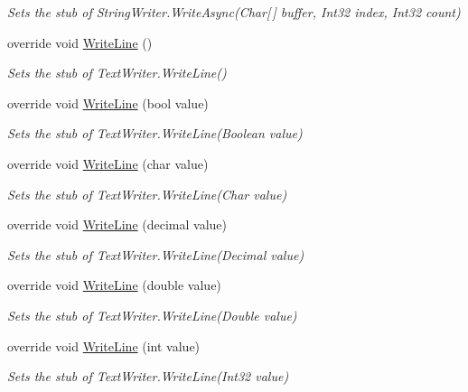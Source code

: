 \begin{DoxyCompactItemize}
\begin{DoxyCompactList}\small\item\em Sets the stub of String\-Writer.\-Write\-Async(\-Char\mbox{[}$\,$\mbox{]} buffer, Int32 index, Int32 count)\end{DoxyCompactList}\item 
override void \hyperlink{class_system_1_1_i_o_1_1_fakes_1_1_stub_string_writer_a6a7a9ef8c75e1f8643107f5061cd4735}{Write\-Line} ()
\begin{DoxyCompactList}\small\item\em Sets the stub of Text\-Writer.\-Write\-Line()\end{DoxyCompactList}\item 
override void \hyperlink{class_system_1_1_i_o_1_1_fakes_1_1_stub_string_writer_a6d8778a6d609ba95a9e8a820251996f5}{Write\-Line} (bool value)
\begin{DoxyCompactList}\small\item\em Sets the stub of Text\-Writer.\-Write\-Line(\-Boolean value)\end{DoxyCompactList}\item 
override void \hyperlink{class_system_1_1_i_o_1_1_fakes_1_1_stub_string_writer_a2ec24c67b82b96d9ad8223518e0c7ded}{Write\-Line} (char value)
\begin{DoxyCompactList}\small\item\em Sets the stub of Text\-Writer.\-Write\-Line(\-Char value)\end{DoxyCompactList}\item 
override void \hyperlink{class_system_1_1_i_o_1_1_fakes_1_1_stub_string_writer_aa4e3aba6ba44803cfe6b12130e55f5dc}{Write\-Line} (decimal value)
\begin{DoxyCompactList}\small\item\em Sets the stub of Text\-Writer.\-Write\-Line(\-Decimal value)\end{DoxyCompactList}\item 
override void \hyperlink{class_system_1_1_i_o_1_1_fakes_1_1_stub_string_writer_a4019fefae40c8c9288733bfb4a9256ec}{Write\-Line} (double value)
\begin{DoxyCompactList}\small\item\em Sets the stub of Text\-Writer.\-Write\-Line(\-Double value)\end{DoxyCompactList}\item 
override void \hyperlink{class_system_1_1_i_o_1_1_fakes_1_1_stub_string_writer_a99124e019b98f38a631ac138c29b43d7}{Write\-Line} (int value)
\begin{DoxyCompactList}\small\item\em Sets the stub of Text\-Writer.\-Write\-Line(\-Int32 value)\end{DoxyCompactList}\item 

\end{DoxyCompactItemize}
